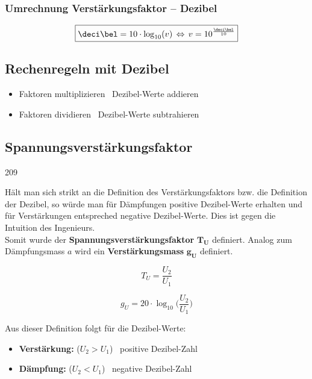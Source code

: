 \subsubsection{Umrechnung Verstärkungsfaktor -- Dezibel}

$$ \boxed{ \deci\bel = 10 \cdot \log_{10} (v) \, \Leftrightarrow \, v = 10^{\frac{\deci\bel}{10}} } $$


\subsection{Rechenregeln mit Dezibel}

\begin{itemize}
    \item Faktoren multiplizieren \textrightarrow\ Dezibel-Werte addieren
    \item Faktoren dividieren \textrightarrow\ Dezibel-Werte subtrahieren
\end{itemize}


\subsection{Spannungsverstärkungsfaktor}{209}

Hält man sich strikt an die Definition des Verstärkungsfaktors bzw. die Definition der Dezibel, so würde man für Dämpfungen positive
Dezibel-Werte erhalten und für Verstärkungen entspreched negative Dezibel-Werte. Dies ist gegen die Intuition des Ingenieurs. \\
Somit wurde der \textbf{Spannungsverstärkungsfaktor} $\bm{T_{U}}$ definiert. Analog zum Dämpfungsmass $a$ wird ein 
\textbf{Verstärkungsmass} $\bm{g_{U}}$ definiert.

\begin{minipage}[c]{0.48\columnwidth}
    $$ \boxed{ T_U = \frac{U_2}{U_1} } $$
\end{minipage}
\hfill
\begin{minipage}[c]{0.48\columnwidth}
    $$ \boxed{ g_U = 20 \cdot \log_{10} \Big( \frac{U_2}{U_1} \Big) } $$
\end{minipage}


Aus dieser Definition folgt für die Dezibel-Werte:

\begin{itemize}
    \item \textbf{Verstärkung: } ($U_2 > U_1$) \textrightarrow\ positive Dezibel-Zahl
    \item \textbf{Dämpfung: } ($U_2 < U_1$) \textrightarrow\ negative Dezibel-Zahl
\end{itemize}


